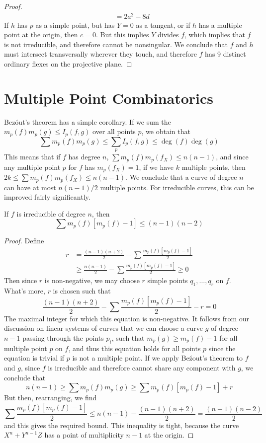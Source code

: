 \begin{proof}
\begin{align*}
        &= 2a^2 - 8d
    \end{align*}
    If $h$ has $p$ as a simple point, but has $Y = 0$ as a tangent, or if $h$ has a multiple point at the origin, then $c = 0$. But this implies $Y$ divides $f$, which implies that $f$ is not irreducible, and therefore cannot be nonsingular. We conclude that $f$ and $h$ must intersect transversally wherever they touch, and therefore $f$ has 9 distinct ordinary flexes on the projective plane.
\end{proof}

\section{Multiple Point Combinatorics}

Bez\'{o}ut's theorem has a simple corollary. If we sum the $m_p(f) m_p(g) \leq I_p(f,g)$ over all points $p$, we obtain that
%
\[ \sum m_p(f)m_p(g) \leq \sum_p I_p(f,g) \leq \deg(f) \deg(g) \]
%
This means that if $f$ has degree $n$, $\sum m_p(f) m_p(f_X) \leq n(n-1)$, and since any multiple point $p$ for $f$ has $m_p(f_X) = 1$, if we have $k$ multiple points, then $2k \leq \sum m_p(f) m_p(f_X) \leq n(n-1)$. We conclude that a curve of degree $n$ can have at most $n(n-1)/2$ multiple points. For irreducible curves, this can be improved fairly significantly.

\begin{theorem}
    If $f$ is irreducible of degree $n$, then
    \[ \sum m_p(f)[m_p(f) - 1] \leq (n-1)(n-2) \]
\end{theorem}
\begin{proof}
    Define
    \begin{align*}
        r &= \frac{(n-1)(n+2)}{2} - \sum \frac{m_p(f)[m_p(f) - 1]}{2}\\
        &\geq \frac{n(n-1)}{2} - \sum \frac{m_p(f)[m_p(f) - 1]}{2} \geq 0
    \end{align*}
    Then since $r$ is non-negative, we may choose $r$ simple points $q_1, \dots, q_r$ on $f$. What's more, $r$ is chosen such that
    \[ \frac{(n-1)(n+2)}{2} - \sum \frac{m_p(f)[m_p(f) - 1]}{2} - r = 0 \]
    The maximal integer for which this equation is non-negative. It follows from our discussion on linear systems of curves that we can choose a curve $g$ of degree $n-1$ passing through the points $p_i$, such that $m_p(g) \geq m_p(f) - 1$ for all multiple point $p$ on $f$, and thus this equation holds for all points $p$ since the equation is trivial if $p$ is not a multiple point. If we apply Be\'{z}out's theorem to $f$ and $g$, since $f$ is irreducible and therefore cannot share any component with $g$, we conclude that
    \[ n(n-1) \geq \sum m_p(f)m_p(g) \geq \sum m_p(f)[m_p(f) - 1] + r \]
    But then, rearranging, we find
    \[ \sum \frac{m_p(f)[m_p(f) - 1]}{2} \leq n(n-1) - \frac{(n-1)(n+2)}{2} = \frac{(n-1)(n-2)}{2} \]
    and this gives the required bound. This inequality is tight, because the curve $X^n + Y^{n-1}Z$ has a point of multiplicity $n-1$ at the origin.
\end{proof}

